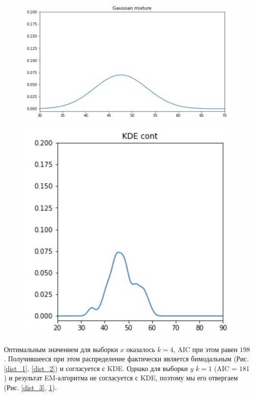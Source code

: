 \documentclass[12pt, fleqn, titlepage]{article}
\begin{document}
    \begin{figure}
        \centering
        \captionsetup{justification=centering}
        \begin{minipage}{.5\textwidth}
          \centering
          \includegraphics[width=\linewidth]{pics/dist_3.png}
          \label{dist_3}
        \end{minipage}%
        \begin{minipage}{.5\textwidth}
          \centering
          \includegraphics[width=.57\linewidth]{pics/dist_4.png}
          \label{dist_4}
        \end{minipage}
    \end{figure}

    Оптимальным значением для выборки $x$ оказалось $k=4$, AIC при этом равен $198$. Получившееся при этом распределение фактически 
    является бимодальным (Рис. \ref{dist_1}, \ref{dist_2}) и согласуется с KDE. Однако для выборки $y$ \quad $k=1$ (AIC = $181$) и результат EM-алгоритма 
    не согласуется с KDE, поэтому мы его отвергаем (Рис. \ref{dist_3}, \ref{dist_4}).
\end{document}

